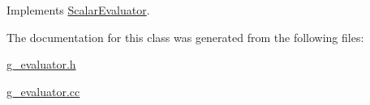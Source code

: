 Implements \hyperlink{classScalarEvaluator_a23640092537e3403bbc5b40389f7f253}{Scalar\-Evaluator}.



The documentation for this class was generated from the following files\-:\begin{DoxyCompactItemize}
\item 
\hyperlink{g__evaluator_8h}{g\-\_\-evaluator.\-h}\item 
\hyperlink{g__evaluator_8cc}{g\-\_\-evaluator.\-cc}\end{DoxyCompactItemize}
